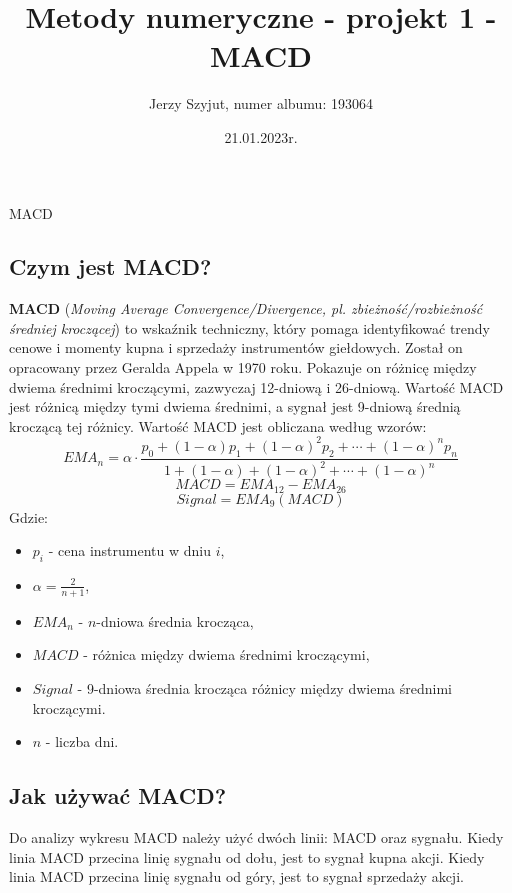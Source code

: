 \documentclass{article}
\title{Metody numeryczne - projekt 1 - MACD}
\author{Jerzy Szyjut, numer albumu: 193064}
\date{21.01.2023r.}
\begin{document}
\maketitle

\begin{section}{MACD}
    \subsection{Czym jest MACD?}
    \textbf{MACD} (\textit{Moving Average Convergence/Divergence, pl. zbieżność/rozbieżność średniej kroczącej}) to wskaźnik techniczny, 
    który pomaga identyfikować trendy cenowe i momenty kupna i sprzedaży instrumentów giełdowych. Został on opracowany przez Geralda Appela w 1970 roku.
    Pokazuje on różnicę między dwiema średnimi kroczącymi, zazwyczaj 12-dniową i 26-dniową. Wartość MACD jest różnicą między tymi dwiema średnimi, 
    a sygnał jest 9-dniową średnią kroczącą tej różnicy. Wartość MACD jest obliczana według wzorów:
    \begin{equation}
        EMA_{n} = \alpha \cdot \frac{p_{0} + (1-\alpha) p_{1} + (1-\alpha)^{2} p_{2} + \cdots + (1-\alpha)^{n} p_{n}}{1 + (1-\alpha) + (1-\alpha)^{2} + \cdots + (1-\alpha)^{n}}
    \end{equation}
    \begin{equation}
        MACD = EMA_{12} - EMA_{26}
    \end{equation}
    \begin{equation}
        Signal = EMA_{9}(MACD)
    \end{equation}
    Gdzie:
    \begin{itemize}
        \item $p_{i}$ - cena instrumentu w dniu $i$,
        \item $\alpha = \frac{2}{n+1}$,
        \item $EMA_{n}$ - $n$-dniowa średnia krocząca,
        \item $MACD$ - różnica między dwiema średnimi kroczącymi,
        \item $Signal$ - 9-dniowa średnia krocząca różnicy między dwiema średnimi kroczącymi.
        \item $n$ - liczba dni.
    \end{itemize}
    \subsection{Jak używać MACD?}
    Do analizy wykresu MACD należy użyć dwóch linii: MACD oraz sygnału. Kiedy linia MACD przecina linię sygnału od dołu, jest to sygnał kupna akcji.
    Kiedy linia MACD przecina linię sygnału od góry, jest to sygnał sprzedaży akcji.
\end{section}
\end{document}
